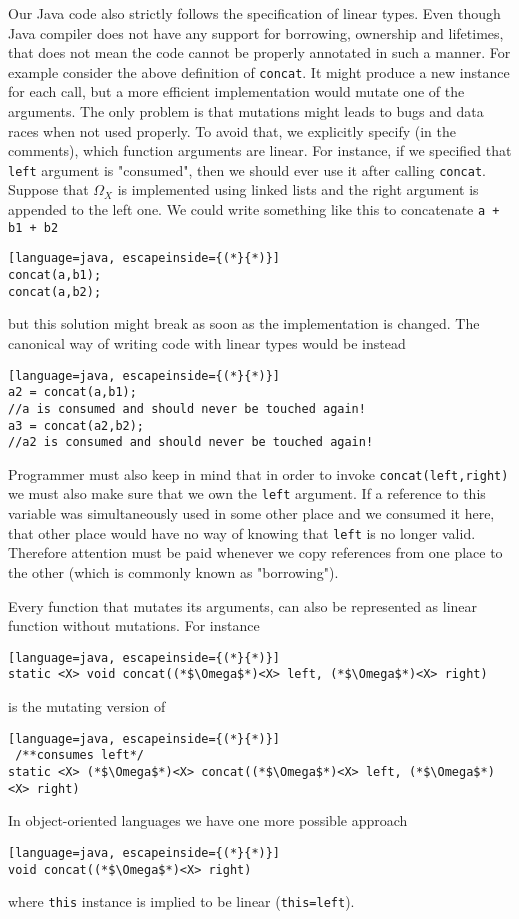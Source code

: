 \documentclass[12pt]{article}
\begin{document}
Our Java code also strictly follows the specification of linear types. Even though Java compiler does not have any support for borrowing, ownership and lifetimes, that does not mean the code cannot be properly annotated in such a manner. For example consider the above definition of \texttt{concat}. It might produce a new instance for each call, but a more efficient implementation would mutate one of the arguments. The only problem is that mutations might leads to bugs and data races when not used properly. To avoid that, we explicitly specify (in the comments), which function arguments are linear.
For instance, if we specified that \texttt{left} argument is "consumed", then we should ever use it after calling \texttt{concat}. Suppose that $\Omega_X$ is implemented using linked lists and the right argument is appended to the left one. We could write something like this to concatenate \texttt{a + b1 + b2}
\begin{lstlisting}[language=java, escapeinside={(*}{*)}]
concat(a,b1);
concat(a,b2);
\end{lstlisting}
but this solution might break as soon as the implementation is changed. The canonical way of writing code with linear types would be instead
\begin{lstlisting}[language=java, escapeinside={(*}{*)}]
a2 = concat(a,b1);
//a is consumed and should never be touched again!
a3 = concat(a2,b2);
//a2 is consumed and should never be touched again!
\end{lstlisting}
 Programmer must also keep in mind that in order to invoke \texttt{concat(left,right)} we must also make sure that we own the \texttt{left} argument. If a reference to this variable was simultaneously used in some other place and we consumed it here, that other place would have no way of knowing that \texttt{left} is no longer valid. Therefore attention must be paid whenever we copy references from one place to the other (which is commonly known as "borrowing"). 
 
 Every function that mutates its arguments, can also be represented as linear function without mutations. For instance 
  \begin{lstlisting}[language=java, escapeinside={(*}{*)}]
static <X> void concat((*$\Omega$*)<X> left, (*$\Omega$*)<X> right)
 \end{lstlisting}
 is the mutating version of 
 \begin{lstlisting}[language=java, escapeinside={(*}{*)}]
 /**consumes left*/
static <X> (*$\Omega$*)<X> concat((*$\Omega$*)<X> left, (*$\Omega$*)<X> right)
 \end{lstlisting}
 In object-oriented languages we have one more possible approach
 \begin{lstlisting}[language=java, escapeinside={(*}{*)}]
void concat((*$\Omega$*)<X> right)
 \end{lstlisting}
 where \texttt{this} instance is implied to be linear (\texttt{this=left}).
 
\end{document}

